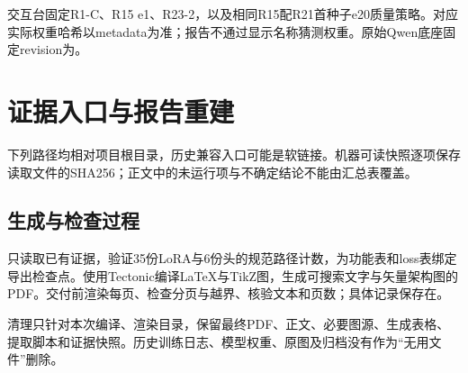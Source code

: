 \documentclass[UTF8,fontset=none,zihao=5,a4paper]{ctexart}
\begin{document}
交互台固定R1-C、R15 e1、R23-2，以及相同R15配R21首种子e20质量策略。对应实际权重哈希以metadata为准；报告不通过显示名称猜测权重。原始Qwen底座固定revision为。
\clearpage

\section{证据入口与报告重建}
\noindent 下列路径均相对项目根目录，历史兼容入口可能是软链接。机器可读快照逐项保存读取文件的SHA256；正文中的未运行项与不确定结论不能由汇总表覆盖。

{\footnotesize
\begin{description}[style=nextline,leftmargin=1.15cm,labelwidth=.9cm]

\end{description}}

\subsection{生成与检查过程}
只读取已有证据，验证35份LoRA与6份头的规范路径计数，为功能表和loss表绑定导出检查点。使用Tectonic编译LaTeX与TikZ图，生成可搜索文字与矢量架构图的PDF。交付前渲染每页、检查分页与越界、核验文本和页数；具体记录保存在。

清理只针对本次编译、渲染目录，保留最终PDF、正文、必要图源、生成表格、提取脚本和证据快照。历史训练日志、模型权重、原图及归档没有作为“无用文件”删除。
\end{document}
